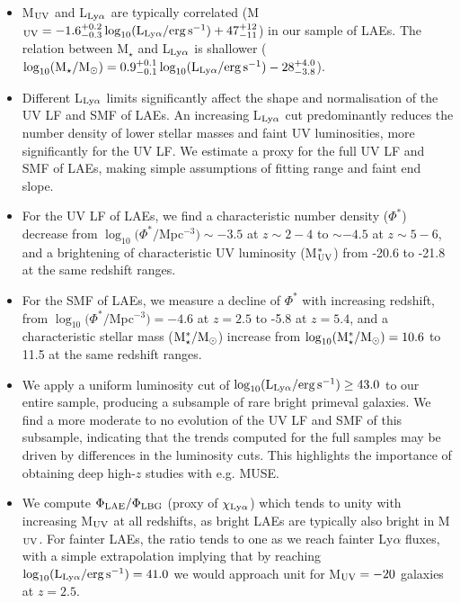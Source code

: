 \documentclass[a4paper,fleqn,usenatbib]{mnras}
\begin{document}
\begin{itemize}

\item M$_{\rm UV}$ and L$_{\rm Ly\alpha}$ are typically correlated (M$_{\rm UV}=-1.6_{-0.3}^{+0.2}\log_{10} (\rm L_{Ly\alpha}/erg\,s^{-1})+47_{-11}^{+12}$) in our sample of LAEs. The relation between M$_\star$ and L$_{\rm Ly\alpha}$ is shallower ($\log_{10} (\rm M_\star/M_\odot)=0.9_{-0.1}^{+0.1}\log_{10} (\rm L_{Ly\alpha}/erg\,s^{-1})-28_{-3.8}^{+4.0}$).

\item Different L$_{\rm Ly\alpha}$ limits significantly affect the shape and normalisation of the UV LF and SMF of LAEs. An increasing L$_{\rm Ly\alpha}$ cut predominantly reduces the number density of lower stellar masses and faint UV luminosities, more significantly for the UV LF. We estimate a proxy for the full UV LF and SMF of LAEs, making simple assumptions of fitting range and faint end slope.

\item For the UV LF of LAEs, we find a characteristic number density ($\Phi^*$) decrease from $\log_{10}(\Phi^*/$Mpc$^{-3})\sim-3.5$ at $z\sim2-4$ to $\sim-4.5$ at $z\sim5-6$, and a brightening of characteristic UV luminosity (M$_{\rm UV}^*$) from -20.6 to -21.8 at the same redshift ranges.

\item For the SMF of LAEs, we measure a decline of $\Phi^*$ with increasing redshift, from $\log_{10}(\Phi^*/$Mpc$^{-3})=-4.6$ at $z=2.5$ to -5.8 at $z=5.4$, and a characteristic stellar mass (${\rm M_\star^*/M_\odot}$) increase from $\log_{10}(\rm M_\star^*/M_\odot)=10.6$ to 11.5 at the same redshift ranges.

\item We apply a uniform luminosity cut of $\log_{10} (\rm L_{Ly\alpha}/erg\,s^{-1}) \geq 43.0$ to our entire sample, producing a subsample of rare bright primeval galaxies. We find a more moderate to no evolution of the UV LF and SMF of this subsample, indicating that the trends computed for the full samples may be driven by differences in the luminosity cuts. This highlights the importance of obtaining deep high-$z$ studies with e.g. MUSE.

\item We compute $\Phi_{\rm LAE}/\Phi_{\rm LBG}$ (proxy of $\chi_{\rm Ly\alpha}$) which tends to unity with increasing M$_{\rm UV}$ at all redshifts, as bright LAEs are typically also bright in M$_{\rm UV}$. For fainter LAEs, the ratio tends to one as we reach fainter Ly$\alpha$ fluxes, with a simple extrapolation implying that by reaching $\log_{10} (\rm L_{Ly\alpha}/erg\,s^{-1})=41.0$ we would approach unit for M$_{\rm UV}=-20$ galaxies at $z=2.5$.


\end{itemize}
\end{document}
